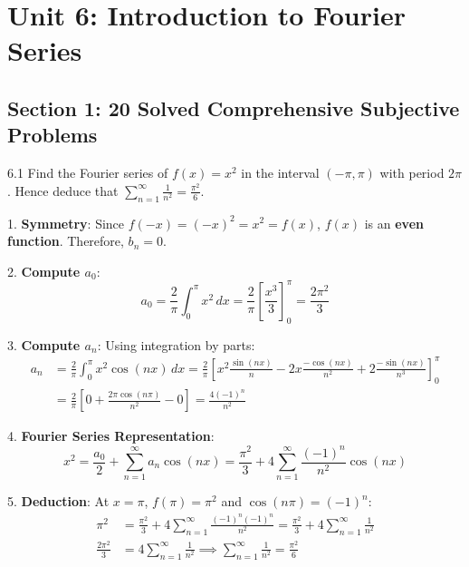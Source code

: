 \chapter{Unit 6: Introduction to Fourier Series}

\section{Section 1: 20 Solved Comprehensive Subjective Problems}

\begin{subjectiveq}{6.1}
Find the Fourier series of $f(x) = x^2$ in the interval $(-\pi, \pi)$ with period $2\pi$. Hence deduce that $\sum_{n=1}^\infty \frac{1}{n^2} = \frac{\pi^2}{6}$.
\end{subjectiveq}

\begin{solbox}
1. \textbf{Symmetry}:
Since $f(-x) = (-x)^2 = x^2 = f(x)$, $f(x)$ is an \textbf{even function}.
Therefore, $b_n = 0$.

2. \textbf{Compute $a_0$}:
\begin{equation}
a_0 = \frac{2}{\pi}\int_0^\pi x^2\,dx = \frac{2}{\pi}\left[ \frac{x^3}{3} \right]_0^\pi = \frac{2\pi^2}{3}
\end{equation}

3. \textbf{Compute $a_n$}:
Using integration by parts:
\begin{align}
a_n &= \frac{2}{\pi}\int_0^\pi x^2 \cos(nx)\,dx = \frac{2}{\pi} \left[ x^2 \frac{\sin(nx)}{n} - 2x \frac{-\cos(nx)}{n^2} + 2 \frac{-\sin(nx)}{n^3} \right]_0^\pi \\
&= \frac{2}{\pi} \left[ 0 + \frac{2\pi \cos(n\pi)}{n^2} - 0 \right] = \frac{4(-1)^n}{n^2}
\end{align}

4. \textbf{Fourier Series Representation}:
\begin{equation}
x^2 = \frac{a_0}{2} + \sum_{n=1}^\infty a_n \cos(nx) = \frac{\pi^2}{3} + 4\sum_{n=1}^\infty \frac{(-1)^n}{n^2}\cos(nx)
\end{equation}

5. \textbf{Deduction}:
At $x = \pi$, $f(\pi) = \pi^2$ and $\cos(n\pi) = (-1)^n$:
\begin{align}
\pi^2 &= \frac{\pi^2}{3} + 4\sum_{n=1}^\infty \frac{(-1)^n (-1)^n}{n^2} = \frac{\pi^2}{3} + 4\sum_{n=1}^\infty \frac{1}{n^2} \\
\frac{2\pi^2}{3} &= 4\sum_{n=1}^\infty \frac{1}{n^2} \implies \sum_{n=1}^\infty \frac{1}{n^2} = \frac{\pi^2}{6}
\end{align}
\end{solbox}

